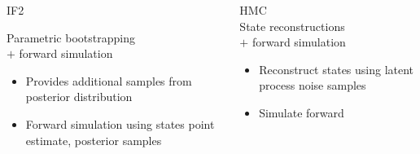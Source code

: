 \documentclass[12pt]{beamer}
\begin{document}
\begin{frame}

	\begin{columns}

		\begin{column}[t]{0.55\textwidth}

			\null
			\large
			IF2 \\
			\vspace{\baselineskip}

			\normalsize
			Parametric bootstrapping \\
			$+$ forward simulation
			\vspace{\baselineskip}
			
			\footnotesize
			\begin{itemize}
				\item Provides additional samples from posterior distribution
				\item Forward simulation using states point estimate, posterior samples
			\end{itemize}
			
		\end{column}
		\begin{column}[t]{0.45\textwidth}

			\null
			\large
			HMC \\
			\vspace{\baselineskip}
			\normalsize
			State reconstructions \\
			$+$ forward simulation
			\vspace{\baselineskip}
			
			\footnotesize
			\begin{itemize}
				\item Reconstruct states using latent process noise samples
				\item Simulate forward
			\end{itemize}

		\end{column}
	\end{columns}
	
\end{frame}
\end{document}
